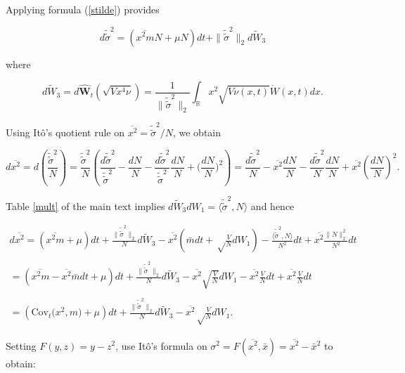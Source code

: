 \documentclass[]{article}
\begin{document}
Applying formula (\ref{stilde}) provides

\begin{equation}
d\tilde{\tilde\sigma}^2=\left(\overline{x^2m}N+\mu N\right)dt+\|\tilde{\tilde\sigma}^2\|_2d\tilde W_3
\end{equation}

where

\begin{equation}
d\tilde{W}_3=d\hat{\mathbf W}_t(\sqrt{V x^4\nu})
=\frac{1}{\|\tilde{\tilde\sigma}^2\|_2}\int_\mathbb{R}x^2\sqrt{V\nu(x,t)}\dot W(x,t)dx.
\end{equation}

Using Itô's quotient rule on
\(\overline{x^2}=\tilde{\tilde\sigma}^2/N\), we obtain

\begin{equation}
d\overline{x^2} = d\left(\frac{\tilde{\tilde\sigma}^2}{N}\right)=\frac{\tilde{\tilde\sigma}^2}{N}\left(\frac{d\tilde{\tilde\sigma}^2}{\tilde{\tilde\sigma}^2}-\frac{dN}{N}-\frac{d\tilde{\tilde\sigma}^2}{\tilde{\tilde\sigma}^2}\frac{dN}{N}+\Big(\frac{dN}{N}\Big)^2\right)
=\frac{d\tilde{\tilde\sigma}^2}{N}-\overline{x^2}\frac{dN}{N}-\frac{d\tilde{\tilde\sigma}^2}{N}\frac{dN}{N}+\overline{x^2}\left(\frac{dN}{N}\right)^2.
\end{equation}

Table \ref{mult} of the main text implies
\(d\tilde W_3d W_1=\langle\tilde{\tilde\sigma}^2,N\rangle\) and hence

\begin{multline}
d\overline{x^2}=\left(\overline{x^2m} + \mu \right)dt+\frac{\|\tilde{\tilde\sigma}^2\|_2}{N}d\tilde W_3
-\overline{x^2}\left(\bar m dt+\sqrt\frac{V}{N}dW_1\right)-\frac{\langle\tilde{\tilde\sigma}^2,N\rangle}{N^2}dt+\overline{x^2}\frac{\|N\|_2^2}{N^2}dt \\ \\
=\left(\overline{x^2m}-\overline{x^2}\bar mdt + \mu\right)dt+\frac{\|\tilde{\tilde\sigma}^2\|_2}{N}d\tilde W_3
-\overline{x^2}\sqrt{\frac{V}{N}}d W_1
-\overline{x^2}\frac{V}{N}dt+\overline{x^2}\frac{V}{N}dt \\ \\
=\left(\mathrm{Cov}_t\Big(x^2,m\Big) + \mu \right)dt+\frac{\|\tilde{\tilde\sigma}^2\|_2}{N}d\tilde W_3-\overline{x^2}\sqrt\frac{V}{N}d W_1.
\end{multline}

Setting \(F(y,z)=y-z^2\), use Itô's formula on
\(\sigma^2=F(\overline{x^2},\bar x)=\overline{x^2}-\bar x^2\) to obtain:
\end{document}
